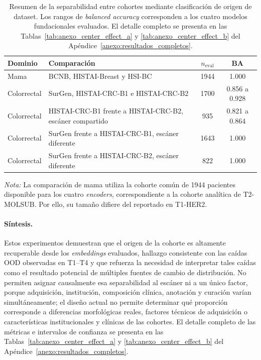 \begin{table}[htbp]
\centering
\caption{Resumen de la separabilidad entre cohortes mediante clasificación de origen de dataset. Los rangos de \textit{balanced accuracy} corresponden a los cuatro modelos fundacionales evaluados. El detalle completo se presenta en las Tablas~\ref{tab:anexo_center_effect_a} y \ref{tab:anexo_center_effect_b} del Apéndice~\ref{anexo:resultados_completos}.}
\label{tab:center_effect}
\small
\begin{tabular}{p{3.0cm} p{5.6cm} c c}
\toprule
\textbf{Dominio} & \textbf{Comparación} &
\textbf{$n_{\text{eval}}$} & \textbf{BA} \\
\midrule
Mama &
BCNB, HISTAI-Breast y HSI-BC &
1944 &
1.000 \\

Colorrectal &
SurGen, HISTAI-CRC-B1 e HISTAI-CRC-B2 &
1700 &
0.856 a 0.928 \\

Colorrectal &
HISTAI-CRC-B1 frente a HISTAI-CRC-B2, escáner compartido &
935 &
0.821 a 0.864 \\

Colorrectal &
SurGen frente a HISTAI-CRC-B1, escáner diferente &
1643 &
1.000 \\

Colorrectal &
SurGen frente a HISTAI-CRC-B2, escáner diferente &
822 &
1.000 \\
\bottomrule
\end{tabular}

\medskip
\footnotesize
\parbox{0.95\textwidth}{\textit{Nota:} La comparación de mama utiliza la cohorte común de 1944 pacientes disponible para los cuatro \textit{encoders}, correspondiente a la cohorte analítica de T2-MOLSUB. Por ello, su tamaño difiere del reportado en T1-HER2.}
\end{table}

\paragraph{Síntesis.} Estos experimentos demuestran que el origen de la cohorte es altamente recuperable desde los \textit{embeddings} evaluados, hallazgo consistente con las caídas OOD observadas en T1--T4 y que refuerza la necesidad de interpretar tales caídas como el resultado potencial de múltiples fuentes de cambio de distribución. No permiten asignar causalmente esa separabilidad al escáner ni a un único factor, porque adquisición, institución, composición clínica, anotación y curación varían simultáneamente; el diseño actual no permite determinar qué proporción corresponde a diferencias morfológicas reales, factores técnicos de adquisición o características institucionales y clínicas de las cohortes. El detalle completo de las métricas e intervalos de confianza se presenta en las Tablas~\ref{tab:anexo_center_effect_a} y \ref{tab:anexo_center_effect_b} del Apéndice~\ref{anexo:resultados_completos}.

